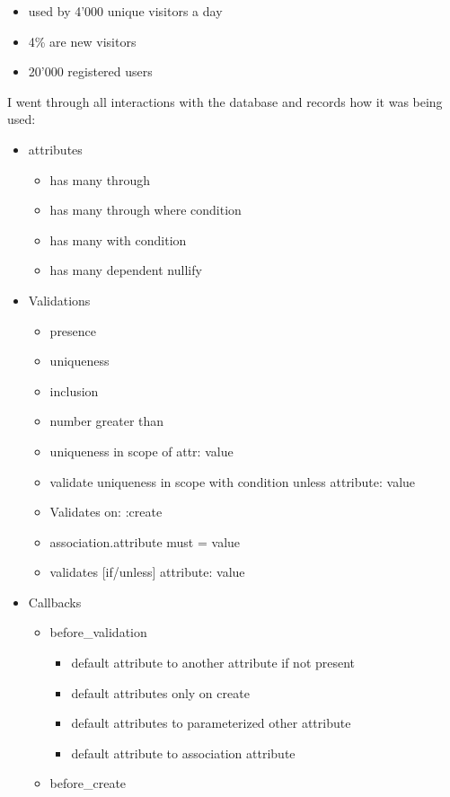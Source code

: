 \documentclass[
  12pt,
]{article}
\providecommand{\tightlist}{%
  \setlength{\itemsep}{0pt}\setlength{\parskip}{0pt}}
\begin{document}
\begin{itemize}
\tightlist
\item
  used by 4'000 unique visitors a day
\item
  4\% are new visitors
\item
  20'000 registered users
\end{itemize}

I went through all interactions with the database and records how it was
being used:

\begin{itemize}
\tightlist
\item
  attributes

  \begin{itemize}
  \tightlist
  \item
    has many through
  \item
    has many through where condition
  \item
    has many with condition
  \item
    has many dependent nullify
  \end{itemize}
\item
  Validations

  \begin{itemize}
  \tightlist
  \item
    presence
  \item
    uniqueness
  \item
    inclusion
  \item
    number greater than
  \item
    uniqueness in scope of attr: value
  \item
    validate uniqueness in scope with condition unless attribute: value
  \item
    Validates on: :create
  \item
    association.attribute must = value
  \item
    validates {[}if/unless{]} attribute: value
  \end{itemize}
\item
  Callbacks

  \begin{itemize}
  \tightlist
  \item
    before\_validation

    \begin{itemize}
    \tightlist
    \item
      default attribute to another attribute if not present
    \item
      default attributes only on create
    \item
      default attributes to parameterized other attribute
    \item
      default attribute to association attribute
    \end{itemize}
  \item
    before\_create


\end{itemize}
\end{itemize}
\end{document}

